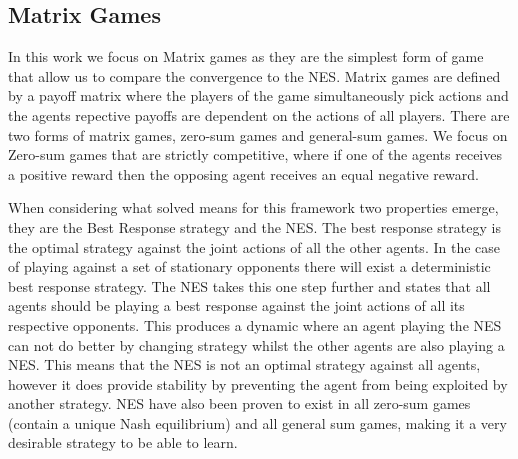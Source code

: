 \documentclass[conference]{IEEEtran}
\begin{document}
\subsection{Matrix Games}

In this work we focus on Matrix games as they are the simplest form of game that allow us to compare the convergence to the NES. Matrix games are defined by a payoff matrix where the players of the game simultaneously pick actions and the agents repective payoffs are dependent on the actions of all players\cite{basar1999dynamic}. There are two forms of matrix games, zero-sum games and general-sum games. We focus on Zero-sum games that are strictly competitive, where if one of the agents receives a positive reward then the opposing agent receives an equal negative reward. 


When considering what solved means for this framework two properties emerge, they are the Best Response strategy and the NES\cite{nash1951non}. The best response strategy is the optimal strategy against the joint actions of all the other agents. In the case of playing against a set of stationary opponents there will exist a deterministic best response strategy. The NES takes this one step further and states that all agents should be playing a best response against the joint actions of all its respective opponents. This produces a dynamic where an agent playing the NES can not do better by changing strategy whilst the other agents are also playing a NES. This means that the NES is not an optimal strategy against all agents, however it does provide stability by preventing the agent from being exploited by another strategy. NES have also been proven to exist in all zero-sum games (contain a unique Nash equilibrium) and all general sum games, making it a very desirable strategy to be able to learn.
\end{document}

